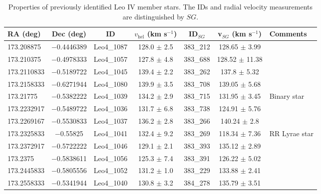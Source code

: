 \begin{table*}[ht]
\centering
\notsotiny
\centering
\caption{Properties of previously identified Leo IV member stars. The \citet{sim2007} IDs and radial velocity measurements are distinguished by $SG$. \label{tab:table_leoiv_previousmembers}}
\begin{tabular}{lcccccl}
\hline
\hline
 RA (deg) & Dec (deg) & ID & $v_\mathrm{hel}$ (km s$^{-1}$) & ID$_{SG}$ & v$_{SG}$ (km s$^{-1}$) & Comments\\
\hline
173.208875  &  $-$0.4446389  &  Leo4\_1087  &  128.0  $\pm$  2.5  &  383\_212  &  128.65  $\pm$  3.99 & \\
173.210375  &  $-$0.4978333  &  Leo4\_1057  &  127.8  $\pm$  4.8  &  383\_688  &  128.52  $\pm$  11.38 & \\
173.2110833  &  $-$0.5189722  &  Leo4\_1045  &  139.4  $\pm$  2.2 &  383\_262  &  137.8  $\pm$  5.32 & \\
173.2158333  &  $-$0.6271944  &  Leo4\_1080  &  139.9  $\pm$  3.5  &  383\_708  &  139.05  $\pm$  5.68 & \\
173.21775  &  $-$0.5382222  &  Leo4\_1039  &  134.2  $\pm$  2.9  &  383\_715  &  131.95  $\pm$  3.45 & Binary star\\
173.2232917  &  $-$0.5489722  &  Leo4\_1036  &  131.7  $\pm$  6.8  &  383\_738  &  124.91  $\pm$  5.76 & \\
173.2269167  &  $-$0.5530833  &  Leo4\_1037  &  136.2  $\pm$  2.8  &  383\_266  &  140.24  $\pm$  2.8 & \\
173.2325833  &  $-$0.55825  &  Leo4\_1041  &  132.4  $\pm$  9.2  &  383\_269  &  118.34  $\pm$  7.36 & RR Lyrae star\\
173.2372917  &  $-$0.5722222  &  Leo4\_1046  &  129.1  $\pm$  2.1  &  383\_393  &  135.12  $\pm$  2.89 & \\
173.2375  &  $-$0.5838611  &  Leo4\_1056  &  125.3  $\pm$  7.4  &  383\_391  &  126.22  $\pm$  5.02 & \\
173.2445833  &  $-$0.5805556  &  Leo4\_1052  &  131.2  $\pm$  1.0  &  383\_229  &  133.88  $\pm$  2.41 & \\
173.2558333  &  $-$0.5341944  &  Leo4\_1040  &  130.8  $\pm$  3.2  &  384\_278  &  135.79  $\pm$  3.51 & \\
\hline
\end{tabular}
\end{table*}